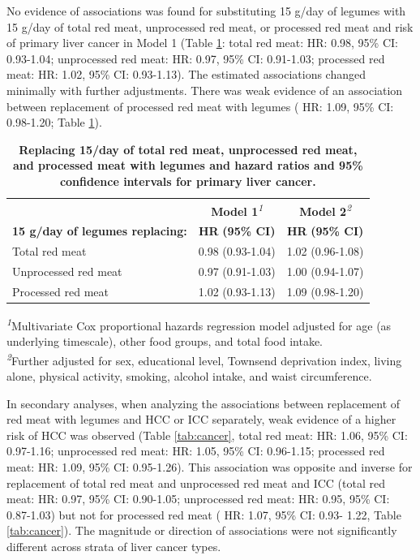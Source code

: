 \documentclass[nutrients,article,submit,moreauthors,pdftex]{Definitions/mdpi}
\begin{document}
No evidence of associations was found for substituting 15 g/day of
legumes with 15 g/day of total red meat, unprocessed red meat, or
processed red meat and risk of primary liver cancer in Model 1 (Table
\ref{tab:main}: total red meat:
HR: 0.98, 95\% CI: 0.93-1.04;
unprocessed red meat:
HR: 0.97, 95\% CI: 0.91-1.03;
processed red meat:
HR: 1.02, 95\% CI: 0.93-1.13).
The estimated associations changed minimally with further adjustments.
There was weak evidence of an association between replacement of
processed red meat with legumes (
HR: 1.09, 95\% CI: 0.98-1.20;
Table \ref{tab:main}).

\begin{table}[t]
\caption{
\label{tab:main}\textbf{Replacing 15/day of total red meat, unprocessed red meat, and processed meat with legumes and hazard ratios and 95\% confidence intervals for primary liver cancer.}} 
\fontsize{9.0pt}{10.8pt}\selectfont
\begin{tabular*}{1\linewidth}{@{\extracolsep{\fill}}lcc}
\toprule
 & {\bfseries \textbf{Model 1}}\textsuperscript{\textit{1}} & {\bfseries \textbf{Model 2}}\textsuperscript{\textit{2}} \\ 
\cmidrule(lr){2-2} \cmidrule(lr){3-3}
\textbf{15 g/day of legumes replacing:} & \textbf{HR} \textbf{(95\% CI)} & \textbf{HR} \textbf{(95\% CI)} \\ 
\midrule\addlinespace[2.5pt]
Total red meat & 0.98 (0.93-1.04) & 1.02 (0.96-1.08) \\ 
Unprocessed red meat & 0.97 (0.91-1.03) & 1.00 (0.94-1.07) \\ 
Processed red meat & 1.02 (0.93-1.13) & 1.09 (0.98-1.20) \\ 
\bottomrule
\end{tabular*}
\begin{minipage}{\linewidth}
\textsuperscript{\textit{1}}Multivariate Cox proportional hazards regression model adjusted for age (as underlying timescale), other food groups, and total food intake.\\
\textsuperscript{\textit{2}}Further adjusted for sex, educational level, Townsend deprivation index, living alone, physical activity, smoking, alcohol intake, and waist circumference.\\
\end{minipage}
\end{table}

In secondary analyses, when analyzing the associations between
replacement of red meat with legumes and HCC or ICC separately, weak
evidence of a higher risk of HCC was observed (Table \ref{tab:cancer},
total red meat:
HR: 1.06, 95\% CI: 0.97-1.16;
unprocessed red meat:
HR: 1.05, 95\% CI: 0.96-1.15;
processed red meat:
HR: 1.09, 95\% CI: 0.95-1.26).
This association was opposite and inverse for replacement of total red
meat and unprocessed red meat and ICC (total red meat:
HR: 0.97, 95\% CI: 0.90-1.05;
unprocessed red meat:
HR: 0.95, 95\% CI: 0.87-1.03)
but not for processed red meat (
HR: 1.07, 95\% CI: 0.93- 1.22,
Table \ref{tab:cancer}). The magnitude or direction of associations
were not significantly different across strata of liver cancer types.
\end{document}
